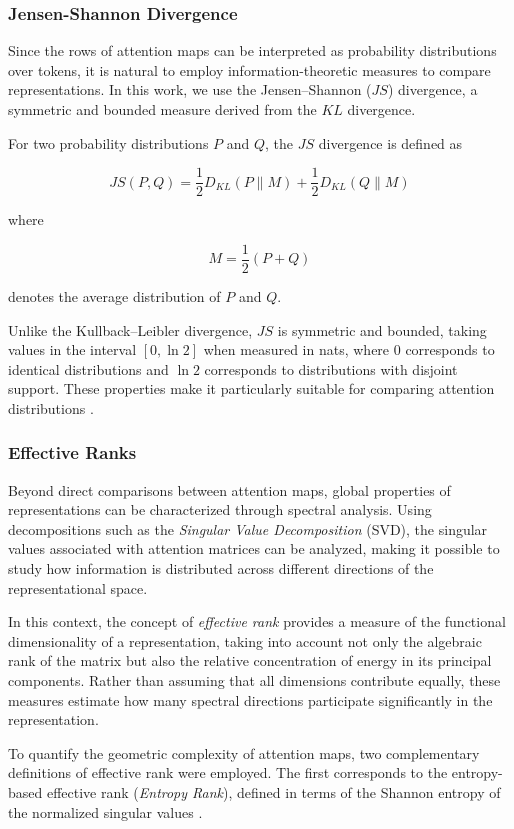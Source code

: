 \documentclass[conference]{IEEEtran}
\begin{document}
\subsubsection{Jensen-Shannon Divergence}

Since the rows of attention maps can be interpreted as probability distributions over tokens, it is natural to employ information-theoretic measures to compare representations. In this work, we use the Jensen--Shannon ($JS$) divergence, a symmetric and bounded measure derived from the $KL$ divergence.

For two probability distributions $P$ and $Q$, the $JS$ divergence is defined as

\[
JS(P,Q)
=
\frac{1}{2}
D_{KL}(P\|M)
+
\frac{1}{2}
D_{KL}(Q\|M)
\]

where

\[
M
=
\frac{1}{2}(P+Q)
\]

denotes the average distribution of $P$ and $Q$.

Unlike the Kullback--Leibler divergence, $JS$ is symmetric and bounded, taking values in the interval $[0,\ln 2]$ when measured in nats, where $0$ corresponds to identical distributions and $\ln 2$ corresponds to distributions with disjoint support. These properties make it particularly suitable for comparing attention distributions \cite{lin1991divergence}.

\subsubsection{Effective Ranks}

Beyond direct comparisons between attention maps, global properties of representations can be characterized through spectral analysis. Using decompositions such as the \textit{Singular Value Decomposition} (SVD), the singular values associated with attention matrices can be analyzed, making it possible to study how information is distributed across different directions of the representational space.

In this context, the concept of \textit{effective rank} provides a measure of the functional dimensionality of a representation, taking into account not only the algebraic rank of the matrix but also the relative concentration of energy in its principal components. Rather than assuming that all dimensions contribute equally, these measures estimate how many spectral directions participate significantly in the representation.

To quantify the geometric complexity of attention maps, two complementary definitions of effective rank were employed. The first corresponds to the entropy-based effective rank (\textit{Entropy Rank}), defined in terms of the Shannon entropy of the normalized singular values \cite{roy2007effective}.
\end{document}
